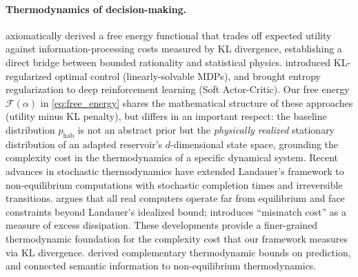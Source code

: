 \documentclass[11pt,a4paper]{article}
\theoremstyle{definition}
\newcommand{\FE}{\mathcal{F}}
\begin{document}
\paragraph{Thermodynamics of decision-making.}
\citet{ortega2013} axiomatically derived a free energy functional that
trades off expected utility against information-processing costs measured
by KL divergence, establishing a direct bridge between bounded rationality
and statistical physics.  \citet{todorov2009} introduced KL-regularized
optimal control (linearly-solvable MDPs), and \citet{haarnoja2018} brought
entropy regularization to deep reinforcement learning (Soft Actor-Critic).
Our free energy $\FE(\alpha)$ in \eqref{eq:free_energy} shares the
mathematical structure of these approaches (utility minus KL penalty), but
differs in an important respect: the baseline distribution $p_{\mathrm{hab}}$
is not an abstract prior but the \emph{physically realized} stationary
distribution of an adapted reservoir's $d$-dimensional state space,
grounding the complexity cost in the thermodynamics of a specific
dynamical system.
Recent advances in stochastic thermodynamics
\citep{wolpert2024, manzano2024} have extended Landauer's framework
\citep{landauer1961} to non-equilibrium computations with stochastic
completion times and irreversible transitions.
\citet{wolpert2024} argues that all real computers operate far from
equilibrium and face constraints beyond Landauer's idealized bound;
\citet{manzano2024} introduces ``mismatch cost'' as a measure of
excess dissipation.  These developments provide a finer-grained
thermodynamic foundation for the complexity cost that our framework
measures via KL divergence.  \citet{still2012} derived complementary
thermodynamic bounds on prediction, and \citet{kolchinsky2018} connected
semantic information to non-equilibrium thermodynamics.
\end{document}
